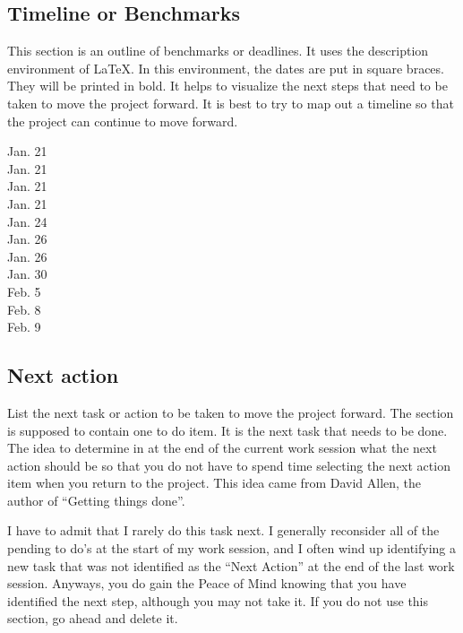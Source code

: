 \documentclass[10pt,letterpaper]{article}
\begin{document}
\subsection{Timeline or Benchmarks}
\label{sub:benchmarks}

This section is an outline of benchmarks or deadlines.
It uses the description environment of LaTeX.
In this environment, the dates are put in square braces.
They will be printed in bold.
It helps to visualize the next steps that need to be taken to move the project forward.
It is best to try to map out a timeline so that the project can continue to move forward.


\begin{description}
\item [Jan. 21]
\item [Jan. 21]
\item [Jan. 21] 
\item [Jan. 21] 
\item [Jan. 24] 
\item [Jan. 26]
\item [Jan. 26]
\item [Jan. 30] 
\item [Feb. 5] 
\item [Feb. 8]
\item [Feb. 9]
\end{description}

\subsection{Next action}
\label{sub:next}

List the next task or action to be taken to move the project forward.
The section is supposed to contain one to do item.
It is the next task that needs to be done.
The idea to determine in at the end of the current work session what the next action should be so that you do not have to spend time selecting the next action item when you return to the project.
This idea came from David Allen, the author of ``Getting things done''.

I have to admit that I rarely do this task next. 
I generally reconsider all of the pending to do's at the start of my work session, and I often wind up identifying a new task that was not identified as the ``Next Action'' at the end of the last work session.
Anyways, you do gain the Peace of Mind knowing that you have identified the next step, although you may not take it.
If you do not use this section, go ahead and delete it.
\end{document}
